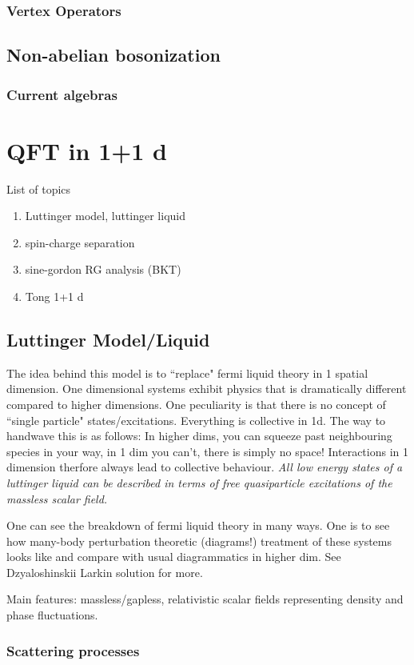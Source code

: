 \documentclass{article}
\begin{document}
\subsubsection{Vertex Operators}
\subsection{Non-abelian bosonization}
\subsubsection{Current algebras}
\section{QFT in 1+1 d}
List of topics
\begin{enumerate}
    \item Luttinger model, luttinger liquid
    \item spin-charge separation
    \item sine-gordon RG analysis (BKT)
    \item Tong 1+1 d
\end{enumerate}
\subsection{Luttinger Model/Liquid}
The idea behind this model is to ``replace" fermi liquid theory in 1 spatial dimension. One dimensional systems exhibit physics that is dramatically different compared to higher dimensions. One peculiarity is that there is no concept of ``single particle" states/excitations. Everything is collective in 1d. The way to handwave this is as follows: In higher dims, you can squeeze past neighbouring species in your way, in 1 dim you can't, there is simply no space! Interactions in 1 dimension therfore always lead to collective behaviour. \emph{All low energy states of a luttinger liquid can be described in terms of free quasiparticle excitations of the massless scalar field.}

One can see the breakdown of fermi liquid theory in many ways. One is to see how many-body perturbation theoretic (diagrams!) treatment of these systems looks like and compare with usual diagrammatics in higher dim. See Dzyaloshinskii Larkin solution for more. \cite{sadovskii2006diagrammatics, giamarchi2003quantum}

Main features: massless/gapless, relativistic scalar fields representing density and phase fluctuations.
\subsubsection{Scattering processes}
\end{document}
